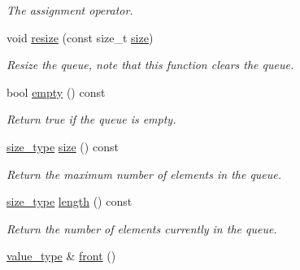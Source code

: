 \begin{DoxyCompactItemize}
\begin{DoxyCompactList}\small\item\em \-The assignment operator. \end{DoxyCompactList}\item 
\hypertarget{classxsens_1_1FifoQueueBasic_a65b60d55a8f43de327a8e74d89a3ab36}{void \hyperlink{classxsens_1_1FifoQueueBasic_a65b60d55a8f43de327a8e74d89a3ab36}{resize} (const size\-\_\-t \hyperlink{classxsens_1_1FifoQueueBasic_a918b730b9085edd926404337d588d002}{size})}\label{classxsens_1_1FifoQueueBasic_a65b60d55a8f43de327a8e74d89a3ab36}

\begin{DoxyCompactList}\small\item\em \-Resize the queue, note that this function clears the queue. \end{DoxyCompactList}\item 
\hypertarget{classxsens_1_1FifoQueueBasic_aefc810309cd8e547fe6518d09d3ba825}{bool \hyperlink{classxsens_1_1FifoQueueBasic_aefc810309cd8e547fe6518d09d3ba825}{empty} () const }\label{classxsens_1_1FifoQueueBasic_aefc810309cd8e547fe6518d09d3ba825}

\begin{DoxyCompactList}\small\item\em \-Return true if the queue is empty. \end{DoxyCompactList}\item 
\hypertarget{classxsens_1_1FifoQueueBasic_a918b730b9085edd926404337d588d002}{\hyperlink{classxsens_1_1FifoQueueBasic_abef5a7d633ee8b57a33360bf3b3efdef}{size\-\_\-type} \hyperlink{classxsens_1_1FifoQueueBasic_a918b730b9085edd926404337d588d002}{size} () const }\label{classxsens_1_1FifoQueueBasic_a918b730b9085edd926404337d588d002}

\begin{DoxyCompactList}\small\item\em \-Return the maximum number of elements in the queue. \end{DoxyCompactList}\item 
\hypertarget{classxsens_1_1FifoQueueBasic_a3436798e8adf684fc62dce29feb6ade7}{\hyperlink{classxsens_1_1FifoQueueBasic_abef5a7d633ee8b57a33360bf3b3efdef}{size\-\_\-type} \hyperlink{classxsens_1_1FifoQueueBasic_a3436798e8adf684fc62dce29feb6ade7}{length} () const }\label{classxsens_1_1FifoQueueBasic_a3436798e8adf684fc62dce29feb6ade7}

\begin{DoxyCompactList}\small\item\em \-Return the number of elements currently in the queue. \end{DoxyCompactList}\item 
\hypertarget{classxsens_1_1FifoQueueBasic_a723b25ff30a6da3aec91766a06abd229}{\hyperlink{classxsens_1_1FifoQueueBasic_a4952f1bac21ff075e2b7667cbca0cd0e}{value\-\_\-type} \& \hyperlink{classxsens_1_1FifoQueueBasic_a723b25ff30a6da3aec91766a06abd229}{front} ()}\label{classxsens_1_1FifoQueueBasic_a723b25ff30a6da3aec91766a06abd229}


\end{DoxyCompactItemize}

